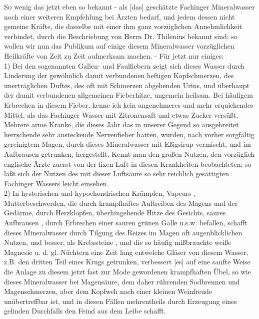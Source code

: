 \documentclass[fontsize=11pt,a5paper,twoside]{memoir}
\begin{document}
\lettrine{S}o wenig das jetzt eben so bekannt -
als [das] geschätzte Fachinger Mineralwasser
noch einer weiteren Empfehlung bei Ärzten bedarf,
und jedem dessen nicht gemeine Kräfte,
die dasselbe mit einer ihm ganz vorzüglichen Annehmlichkeit verbindet,
durch die Beschriebung von Herrn Dr. Thilenius bekannt sind;
so wollen wir nun das Publikum
auf einige diesem Mineralwasser vorzüglichen Heilkräfte
von Zeit zu Zeit aufmerksam machen. -
Für jetzt nur einiges:\\

1) Bei den sogenannten Gallen- und Faulfiebern
zeigt sich dieses Wasser durch Linderung
der gewöhnlich damit verbundenen heftigen Kopfschmerzen,
des unerträglichen Duftes,
des oft mit Schmerzen abgehenden Urins,
und überhaupt der damit verbundenen allgemeinen Fieberhitze,
ungemein heilsam.
Bei häufigem Erbrechen in diesem Fieber,
kenne ich kein angenehmeres und mehr erquickendes Mittel,
als das Fachinger Wasser mit Zitronensaft und etwas Zucker versüßt.
Mehrere arme Kranke,
die dieses Jahr das in unserer Gegend
so ausgebreitet herrschende sehr ansteckende Nervenfieber hatten,
wurden, nach vorher sorgfältig gereinigtem Magen,
durch dieses Mineralwasser mit Eßigsirup vermischt,
und im Aufbrausen getrunken, hergestellt.
Kennt man den großen Nutzen,
den vorzüglich englische Ärzte
zuerst von der fixen Luft in diesen Krankheiten beobachteten;
so läßt sich der Nutzen
des mit dieser Luftsäure so sehr reichlich gesättigten Fachinger Wassers
leicht einsehen.\\

2) In hysterischen und hypochondrischen Krämpfen, Vapeurs%
,
Mutterbeschwerden,
die durch krampfhaftes Auftreiben des Magens und der Gedärme,
durch Herzklopfen, überhingehende Hitze des Gesichts,
saures Aufbrausen%
,
durch Erbrechen einer sauren grünen Galle u.s.w. befallen,
schafft dieses Mineralwasser
durch Tilgung des Reizes im Magen oft  augenblicklichen Nutzen,
und besser, als Krebssteine%
,
und die so häufig mißbrauchte weiße Magnesie%
u. d. gl. Nüchtern eine Zeit lang entwelche Gläser von diesem Wasser,
z.B. den dritten Teil eines Krugs getrunken,
verbessert [es] auf eine sanfte Weise die Anlage
zu diesem jetzt fast zur Mode gewordenen krampfhaften Übel,
so wie dieses Mineralwasser bei Magensäure,
dem daher rührenden Sodbrennen und Magenschmerzen,
aber dem Kopfweh nach einer kleinen Weinfreude unübertreffbar ist,
und in diesen Fällen mehrentheils
durch Erzeugung eines gelinden Durchfalls
den Feind aus dem Leibe schafft.\\
\end{document}
